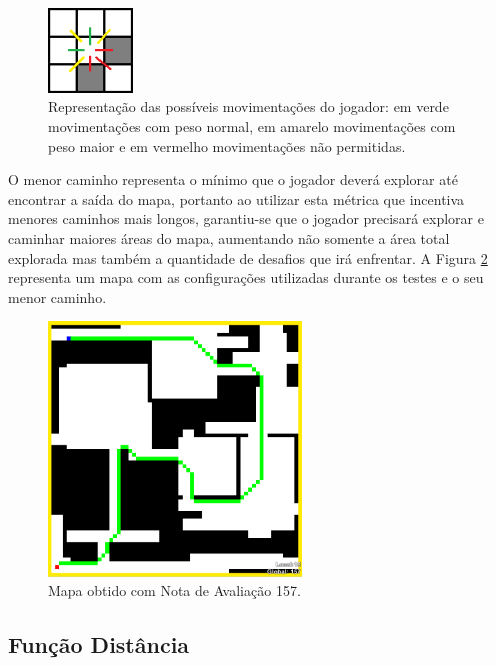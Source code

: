 \begin{figure}[htb]
	\begin{center}
		\includegraphics[width=0.2\textwidth]{Imagens/dev_movement.png}
		\caption{Representação das possíveis movimentações do jogador: em verde movimentações com peso normal, em amarelo movimentações com peso maior e em vermelho movimentações não permitidas.}
		\label{fig:dev_movement}
	\end{center}
\end{figure}

O menor caminho representa o mínimo que o jogador deverá explorar até encontrar a saída do mapa, portanto ao utilizar esta métrica que incentiva menores caminhos mais longos, garantiu-se que o jogador precisará explorar e caminhar maiores áreas do mapa, aumentando não somente a área total explorada mas também a quantidade de desafios que irá enfrentar. A Figura \ref{fig:dev_map} representa um mapa com as configurações utilizadas durante os testes e o seu menor caminho.

\begin{figure}[htb]
	\begin{center}
		\includegraphics[width=0.6\textwidth]{Imagens/dev_map.png}
		\caption{Mapa obtido com Nota de Avaliação 157.}
		\label{fig:dev_map}
	\end{center}
\end{figure}

\subsection{Função Distância}

